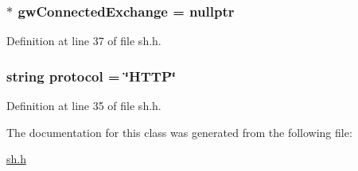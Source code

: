 \subsubsection[{\texorpdfstring{gw\+Connected\+Exchange}{gwConnectedExchange}}]{ $\ast$ gw\+Connected\+Exchange = nullptr}\hypertarget{class_k_1_1_s_h_a6d9ed4a9793ac810eca371568ee912d3}{}\label{class_k_1_1_s_h_a6d9ed4a9793ac810eca371568ee912d3}


Definition at line 37 of file sh.\+h.

\subsubsection[{\texorpdfstring{protocol}{protocol}}]{\setlength{\rightskip}{0pt plus 5cm}string protocol = \char`\"{}H\+T\+TP\char`\"{}}\hypertarget{class_k_1_1_s_h_aeb72b6e20d3a581dcdede91beb824d9f}{}\label{class_k_1_1_s_h_aeb72b6e20d3a581dcdede91beb824d9f}


Definition at line 35 of file sh.\+h.



The documentation for this class was generated from the following file\+:\begin{DoxyCompactItemize}
\item 
\hyperlink{sh_8h}{sh.\+h}\end{DoxyCompactItemize}
